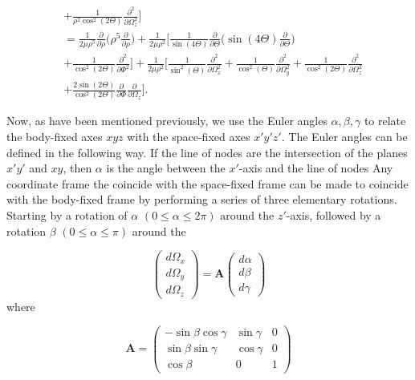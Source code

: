 \documentclass{article}
\numberwithin{equation}{section}
\numberwithin{figure}{section}
\begin{document}
\begin{equation}
\begin{aligned}
&+ \frac{1}{\rho^2\cos^2(2\Theta)}\frac{\partial^2}{\partial\Omega^2_z}\Bigg]\\
&=\frac{1}{2\mu\rho^5}\frac{\partial}{\partial\rho}\Bigg(\rho^5\frac{\partial}{\partial\rho}\Bigg) + \frac{1}{2\mu\rho^2}\Bigg[\frac{1}{\sin(4\Theta)}\frac{\partial}{\partial\Theta}\Bigg(\sin(4\Theta)\frac{\partial}{\partial\Theta}\Bigg)\\
&+\frac{1}{\cos^2(2\Theta)}\frac{\partial^2}{\partial\Phi^2} \Bigg]+\frac{1}{2\mu\rho^2}\Bigg[\frac{1}{\sin^2(\Theta)}\frac{\partial^2}{\partial\Omega^2_x} + \frac{1}{\cos^2(\Theta)}\frac{\partial^2}{\partial\Omega^2_y} + \frac{1}{\cos^2(2\Theta)}\frac{\partial^2}{\partial\Omega^2_z}\\
&+ \frac{2\sin(2\Theta)}{\cos^2(2\Theta)}\frac{\partial}{\partial\Phi}\frac{\partial}{\partial\Omega_z}\Bigg].
\end{aligned}
\end{equation}

Now, as have been mentioned previously, we use the Euler angles $\alpha,\beta,\gamma$ to relate the body-fixed axes $xyz$ with the space-fixed axes $x'y'z'$. The Euler angles can be defined in the following way. If the line of nodes are the intersection of the planes $x'y'$ and $xy$, then $\alpha$ is the angle between the $x'$-axis and the line of nodes  Any coordinate frame the coincide with the space-fixed frame can be made to coincide with the body-fixed frame by performing a series of three elementary rotations. Starting by a rotation of $\alpha$ $(0 \leq \alpha \leq 2\pi)$ around the $z'$-axis, followed by a rotation $\beta$ $(0 \leq \alpha \leq \pi)$ around the   

\begin{equation}
\begin{pmatrix}
d\Omega_x\\
d\Omega_y\\
d\Omega_z
\end{pmatrix}
=
\mathbf{A}\begin{pmatrix}
d\alpha\\
d\beta\\
d\gamma
\end{pmatrix}
\end{equation}
where

\begin{equation}
\mathbf{A}=
\begin{pmatrix}
-\sin\beta\cos\gamma & \sin\gamma & 0\\
\sin\beta\sin\gamma  & \cos\gamma & 0\\
\cos\beta 			 & 0          & 1
\end{pmatrix}
\end{equation}
\end{document}
